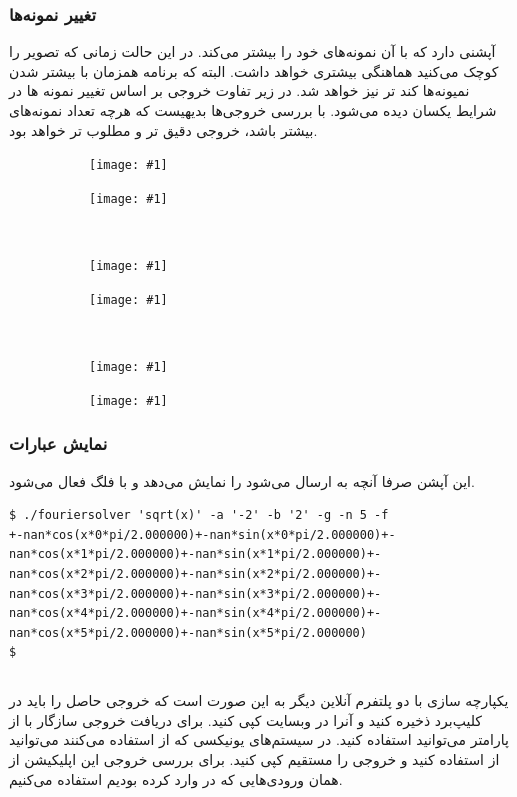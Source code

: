 \documentclass[a4paper]{report}
\newcommand{\subfigr}[2]{
	\begin{subfigure}{0.5\textwidth}
		\texttt{[image: \#1]}
		\caption*{#2}
	\end{subfigure}
}
\begin{document}
\newpage
\subsubsection{تغییر نمونه‌ها}
آپشنی دارد که با آن نمونه‌های خود را بیشتر می‌کند. در این حالت زمانی که تصویر را کوچک می‌کنید هماهنگی بیشتری خواهد داشت.
البته که برنامه  همزمان با بیشتر شدن نمیونه‌ها کند تر نیز خواهد شد. در زیر تفاوت خروجی بر اساس تغییر نمونه ها
در شرایط یکسان دیده می‌شود. با بررسی خروجی‌ها بدیهیست که هرچه تعداد نمونه‌های  بیشتر باشد، خروجی دقیق تر
و مطلوب تر خواهد بود.

\begin{figure}[H]
\subfigr{assets/gnuplot_coshx_s50.png}{}
\subfigr{assets/gnuplot_coshx_s100.png}{}
\\[\smallskipamount]
\subfigr{assets/gnuplot_coshx_s1000.png}{}
\subfigr{assets/gnuplot_coshx_s2000.png}{}
\\[\smallskipamount]
\subfigr{assets/gnuplot_coshx_s5000.png}{}
\subfigr{assets/gnuplot_coshx_s10000.png}{}

\caption*{
}
\end{figure}

\subsubsection{نمایش عبارات}
این آپشن صرفا آنچه به  ارسال می‌شود را نمایش می‌دهد و با فلگ  فعال می‌شود.

\begin{latin}
\begin{verbatim}
$ ./fouriersolver 'sqrt(x)' -a '-2' -b '2' -g -n 5 -f
+-nan*cos(x*0*pi/2.000000)+-nan*sin(x*0*pi/2.000000)+-nan*cos(x*1*pi/2.000000)+-nan*sin(x*1*pi/2.000000)+-nan*cos(x*2*pi/2.000000)+-nan*sin(x*2*pi/2.000000)+-nan*cos(x*3*pi/2.000000)+-nan*sin(x*3*pi/2.000000)+-nan*cos(x*4*pi/2.000000)+-nan*sin(x*4*pi/2.000000)+-nan*cos(x*5*pi/2.000000)+-nan*sin(x*5*pi/2.000000)
$
\end{verbatim}
\end{latin}

\newpage
\subsection{}
یکپارچه سازی با دو پلتفرم آنلاین دیگر به این صورت است که خروجی حاصل را باید در کلیپ‌برد ذخیره کنید و آنرا در وبسایت کپی کنید.
برای دریافت خروجی سازگار با  از پارامتر  می‌توانید استفاده کنید.
در سیستم‌های یونیکسی که از  استفاده می‌کنند می‌توانید از  استفاده کنید و خروجی را مستقیم کپی کنید.
برای بررسی خروجی این اپلیکیشن از همان ورودی‌هایی که در  وارد کرده بودیم استفاده می‌کنیم.
\end{document}
